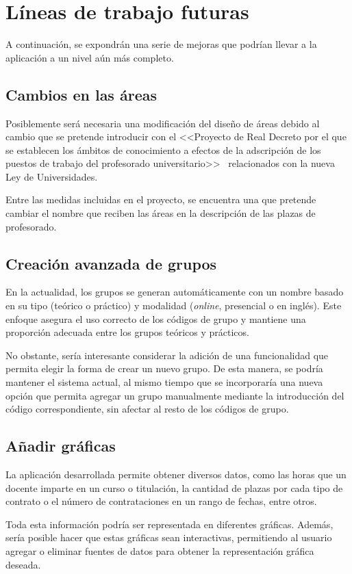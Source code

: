 \section{Líneas de trabajo futuras}
A continuación, se expondrán una serie de mejoras que podrían llevar a la aplicación a un nivel aún más completo.

\subsection{Cambios en las áreas}
Posiblemente será necesaria una modificación del diseño de áreas debido al cambio que se pretende introducir con el <<Proyecto de Real Decreto por el que se establecen los ámbitos de conocimiento a efectos de la adscripción de los puestos de trabajo del profesorado universitario>>~\cite{gob:areas} relacionados con la nueva Ley de Universidades. 

Entre las medidas incluidas en el proyecto, se encuentra una que pretende cambiar el nombre que reciben las áreas en la descripción de las plazas de profesorado.

\subsection{Creación avanzada de grupos}
En la actualidad, los grupos se generan automáticamente con un nombre basado en su tipo (teórico o práctico) y modalidad (\textit{online}, presencial o en inglés). Este enfoque asegura el uso correcto de los códigos de grupo y mantiene una proporción adecuada entre los grupos teóricos y prácticos.

No obstante, sería interesante considerar la adición de una funcionalidad que permita elegir la forma de crear un nuevo grupo. De esta manera, se podría mantener el sistema actual, al mismo tiempo que se incorporaría una nueva opción que permita agregar un grupo manualmente mediante la introducción del código correspondiente, sin afectar al resto de los códigos de grupo.

\subsection{Añadir gráficas}
La aplicación desarrollada permite obtener diversos datos, como las horas que un docente imparte en un curso o titulación, la cantidad de plazas por cada tipo de contrato o el número de contrataciones en un rango de fechas, entre otros.

Toda esta información podría ser representada en diferentes gráficas. Además, sería posible hacer que estas gráficas sean interactivas, permitiendo al usuario agregar o eliminar fuentes de datos para obtener la representación gráfica deseada.

